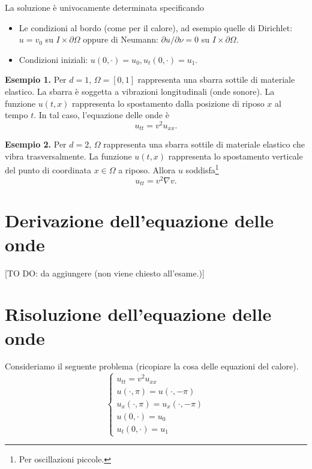 La soluzione è univocamente determinata specificando

\begin{itemize}

	\item Le condizioni al bordo (come per il calore), ad esempio quelle di Dirichlet: $u = v_0$ su $I \times \partial \Omega$ oppure di Neumann: $\partial u / \partial \nu = 0$ su $I \times \partial \Omega$.


	\item Condizioni iniziali: $u(0,\cdot) = u_0, u_t(0,\cdot) = u_1$.

\end{itemize}

\textbf{Esempio 1.} Per $d = 1$, $\Omega = [0,1]$ rappresenta una sbarra sottile di materiale elastico. La sbarra è soggetta a vibrazioni longitudinali (onde sonore).
La funzione $u(t,x)$ rappresenta lo spostamento dalla posizione di riposo $x$ al tempo $t$.
In tal caso, l'equazione delle onde è
%
$$
	u_{tt} = v^2 u_{xx}.
$$
%


\textbf{Esempio 2.} Per $d=2$, $\Omega$ rappresenta una sbarra sottile di materiale elastico che vibra trasversalmente. La funzione $u(t,x)$ rappresenta lo spostamento verticale del punto di coordinata $x \in \Omega$ a riposo. Allora $u$ soddisfa\footnote{Per oscillazioni piccole.}
%
$$
	u_{tt} = v^2 \nabla v.
$$
%


\section{Derivazione dell'equazione delle onde}

[TO DO: da aggiungere (non viene chiesto all'esame.)]

\section{Risoluzione dell'equazione delle onde}

Consideriamo il seguente problema
(ricopiare la cosa delle equazioni del calore).
%
\begin{equation}
\tag{P} \label{eq:17nov2021_problem_1}
\begin{cases}
	u_{tt} = v^2 u_{xx} \\
	u(\cdot, \pi) = u(\cdot, -\pi) \\
	u_x(\cdot, \pi) = u_x(\cdot, -\pi) \\
	u(0,\cdot) = u_0 \\
	u_t(0,\cdot) = u_1
\end{cases} 
\end{equation}

